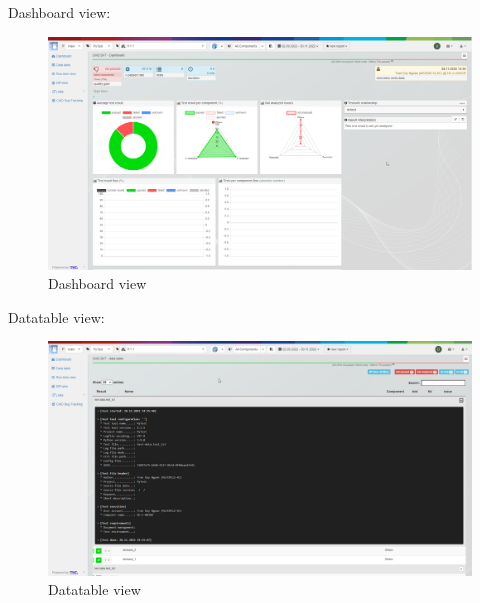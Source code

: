 Dashboard view:

\begin{figure}[h!]
  \includegraphics[width=1\linewidth]{./pictures/Dashboard.png}
  \caption{Dashboard view}
\end{figure}

Datatable view:

\begin{figure}[h!]
  \includegraphics[width=1\linewidth]{./pictures/Datatable.png}
  \caption{Datatable view}
\end{figure}